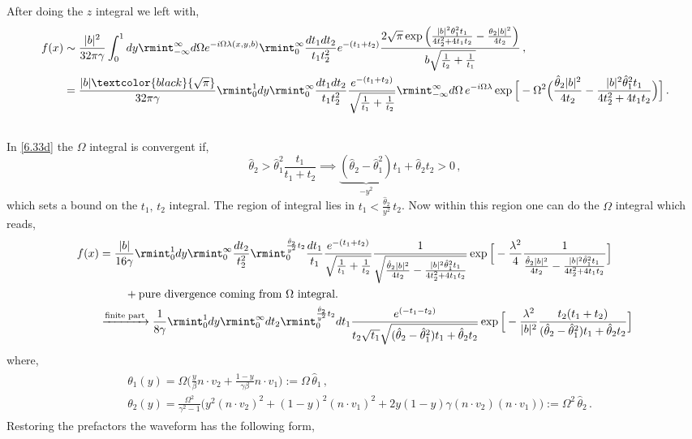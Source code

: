 After doing the $z$ integral we left with,
\begin{align}
    \begin{split}
        f(x)&\sim \frac{|b|^2}{32\pi \gamma}\int_0^1 dy \rmint_{-\infty}^{\infty} d\Omega e^{-i \Omega\lambda(x,y,b)} \rmint_0^\infty \frac{dt_1 dt_2}{t_1 t_2^2}e^{-(t_1+t_2)}\frac{2 \sqrt{\pi } \exp\Big({\frac{|b|^2 \theta _1^2 t_1}{4 t_2^2+4 t_1 t_2}}-\frac{\theta_2|b|^2}{4t_2}\Big)}{b \sqrt{\frac{1}{t_2}+\frac{1}{t_1}}}\,,\\ &
        =\frac{|b|\textcolor{black}{\sqrt{\pi}}}{32\pi \gamma}\rmint_0^1 dy\rmint_0^\infty \frac{dt_1 dt_2}{t_1t_2^2}\frac{e^{-(t_1+t_2)}}{\sqrt{\frac{1}{t_1}+\frac{1}{t_2}}}\rmint_{-\infty}^{\infty} d\Omega\,e^{-i\Omega \lambda}\exp\Big[-\Omega^2\Big(\frac{\hat{\theta}_2|b|^2}{4t_2}-\frac{|b|^2\hat\theta_1^2t_1}{4t_2^2+4t_1t_2}\Big)\Big]\,.\\ &
       \label{6.33d}
    \end{split}
\end{align}
In \eqref{6.33d} the $\Omega$ integral is convergent if,
$$\hat{\theta}_2>\hat{\theta}_1^2\frac{t_1}{t_1+t_2}\implies \underbrace{(\hat\theta_2-\hat\theta_1^2)}_{-y^2}t_1+\hat\theta_2 t_2>0\,,$$
which sets a bound on the $t_1,\, t_2$ integral. The region of integral lies in $t_1< \frac{\hat\theta_2}{y^2}\,t_2$. Now within this region one can do the $\Omega$ integral which reads,
\begin{align}
\begin{split}
      f(x)&   =\frac{|b|}{16 \gamma}\rmint_0^1 dy\rmint_0^\infty \frac{dt_2}{t_2^2}\rmint_0^{\frac{\hat\theta_2}{y^2}t_2}\frac{ dt_1}{t_1}\frac{e^{-(t_1+t_2)}}{\sqrt{\frac{1}{t_1}+\frac{1}{t_2}}}\frac{1}{\sqrt{\frac{\hat{\theta}_2|b|^2}{4t_2}-\frac{|b|^2\hat\theta_1^2t_1}{4t_2^2+4t_1t_2}}}\exp\Big[-\frac{\lambda^2}{4}\frac{1}{\frac{\hat{\theta}_2|b|^2}{4t_2}-\frac{|b|^2\hat\theta_1^2t_1}{4t_2^2+4t_1t_2}}\Big]\\ &\hspace{0.8cm}+ \textrm{pure divergence coming from $\Omega$ integral.}\\ &
        \xrightarrow[]{\textrm{finite part}}\frac{1}{8 \gamma}\rmint_0^1 dy\rmint_0^\infty dt_2 \rmint_{0}^{\frac{\hat\theta_2}{y^2}t_2}dt_1\frac{e^{(-t_1-t_2)}}{t_2\sqrt{t_1}\sqrt{(\hat\theta_2-\hat\theta_1^2)t_1+\hat\theta_2 t_2}}\exp\Big[-\frac{\lambda^2}{|b|^2}\frac{t_2(t_1+t_2)}{(\hat\theta_2-\hat\theta_1^2)t_1+\hat\theta_2 t_2}\Big]
    \end{split}
\end{align}
where,
\begin{align}
    \begin{split}
        &\theta_1(y)=\Omega\Big(\frac{y}{\beta}n\cdot v_2+\frac{1-y}{\gamma\beta}n\cdot v_1\Big):=\Omega\, \hat\theta_1\,,\\ &
        \theta_2(y)=\frac{\Omega^2}{{\gamma^2-1}}\Big({y^2(n\cdot v_2)^2+(1-y)^2(n\cdot v_1)^2+2y (1-y)\gamma(n\cdot v_2)(n\cdot v_1)}\Big):=\Omega^2\,\hat\theta_2\,.
    \end{split}
\end{align}
Restoring the prefactors the waveform has the following form,

